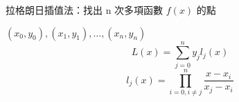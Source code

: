 拉格朗日插值法：找出 n 次多項函數 $f(x)$ 的點 \par
$(x_0, y_0), (x_1, y_1),\dots, (x_n, y_n)$
\[
    L(x)=\sum_{j=0}^{n} y_jl_j(x)
\]
\[
    l_j(x)=\prod_{i=0,i\ne j}^{n} \frac{x-x_i}{x_j-x_i}
\]